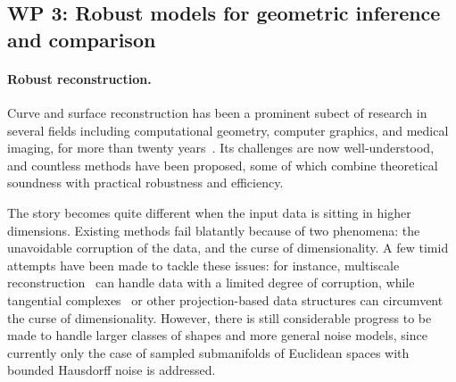 \subsection*{WP 3:  Robust models for geometric inference and comparison} 


%
%







\paragraph{Robust reconstruction.}

Curve and surface reconstruction has been a prominent subect of
research in several fields including computational geometry, computer
graphics, and medical imaging, for more than twenty
years~\cite{dey-csr-2007}. Its challenges are now well-understood, and
countless methods have been proposed, some of which combine
theoretical soundness with practical robustness and efficiency.

The story becomes quite different when the input data is sitting in
higher dimensions. Existing methods fail blatantly because of two
phenomena: the unavoidable corruption of the data, and the curse of
dimensionality. A few timid attempts have been made to tackle these
issues: for instance, multiscale
reconstruction~\cite{geometrica-bgo-09} can handle data with a limited
degree of corruption, while tangential
complexes~\cite{geometrica-7142i} or other projection-based data
structures can circumvent the curse of dimensionality. However, there
is still considerable progress to be made to handle larger classes of
shapes and more general noise models, since currently only the case of
sampled submanifolds of Euclidean spaces with bounded Hausdorff noise
is addressed.

